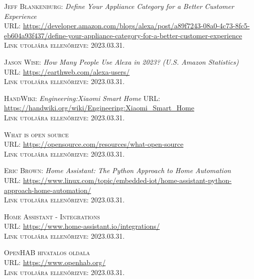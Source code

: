 \documentclass[
]{thesis-ekf}
\theoremstyle{definition}
\theoremstyle{remark}
\begin{document}
	\begin{thebibliography}{20}
		
		\textsc{Jeff Blankenburg}: \emph{Define Your Appliance Category for a Better Customer Experience}\\
		\textsc{URL:}%
		 \url{https://developer.amazon.com/blogs/alexa/post/a89f7243-08a0-4c73-8fc5-eb604a93f437/define-your-appliance-category-for-a-better-customer-experience}\\
		\textsc{Link utoljára ellenőrizve:} 2023.03.31.
		
		\textsc{Jason Wise}: \emph{How Many People Use Alexa in 2023? (U.S. Amazon Statistics)} \\
		\textsc{URL:} \url{https://earthweb.com/alexa-users/}\\
		\textsc{Link utoljára ellenőrizve:} 2023.03.31.
		
		\textsc{HandWiki}: \emph{Engineering:Xiaomi Smart Home}
		\textsc{URL:} \url{https://handwiki.org/wiki/Engineering:Xiaomi_Smart_Home}\\
		\textsc{Link utoljára ellenőrizve:} 2023.03.31.
		
		\textsc{What is open source}\\
		\textsc{URL:} \url{https://opensource.com/resources/what-open-source}\\
		\textsc{Link utoljára ellenőrizve:} 2023.03.31.
		
		\textsc{Eric Brown}: \emph{Home Assistant: The Python Approach to Home Automation}\\
		\textsc{URL:} \url{https://www.linux.com/topic/embedded-iot/home-assistant-python-approach-home-automation/}\\
		\textsc{Link utoljára ellenőrizve:} 2023.03.31.
		
		\textsc{Home Assistant - Integrations}\\
		\textsc{URL:} \url{https://www.home-assistant.io/integrations/}\\
		\textsc{Link utoljára ellenőrizve:} 2023.03.31.
		
		\textsc{OpenHAB hivatalos oldala}\\
		\textsc{URL:} \url{https://www.openhab.org/}\\
		\textsc{Link utoljára ellenőrizve:} 2023.03.31.
		

\end{thebibliography}
\end{document}

